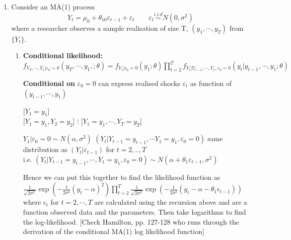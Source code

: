 \documentclass[oneside,openany]{tufte-book} %
\begin{document}
\begin{enumerate}
						\item Consider an MA(1) process
						\begin{equation} Y_t=\mu_0+ \theta_{10} \varepsilon_{t-1}+\varepsilon_t  \qquad 	 \varepsilon _{t}\overset{i.i.d}{\sim} N(0,\sigma^2) \end{equation}
						where a researcher observes a sample realisation of size T, $(y_1,\cdots, y_T)$ from $\{Y_t\}$.
						\medskip
						\begin{enumerate}
						\item	 \textbf{Conditional likelihood:}				 $f_{Y_T,\cdots, Y_1|\varepsilon_0=0}(y_T,\cdots,y_1,; \theta)= f_{Y_1|\epsilon_0=0}(y_1;\theta)	 \displaystyle \prod_{t=2}^{T} f_{Y_t|Y_{t-1},\cdots ,Y_1,\varepsilon_0=0}(y_t| y_{t-1}, \cdots,y_1; \theta)$
					
							
						 \textbf{Conditional on} $\varepsilon_0=0$ can express realised shocks $\varepsilon_t$ as function of $(y_{t-1}, \cdots, y_1)$ 
							
							
						\vspace{15pt}
						   \hspace{39pt}            [$Y_1=y_1$]\\
					\vspace{9pt}
						         \hspace{39pt}         [$Y_1=y_1, Y_2=y_2$]	\vspace{9pt}
						      \hspace{39pt}            $\vdots$	\vspace{9pt}
						 \hspace{39pt}    [$Y_1=y_1, \cdots, Y_T=y_T$]
						
							\vspace{15pt}
				  $Y_1|\varepsilon_0=0\sim  N(\alpha,\sigma^2)$
							\vspace{12pt}
						 $(Y_t|Y_{t-1}=y_{t-1},\cdots Y_1=y_1,\varepsilon_0=0)$ same distribution as $(Y_{t}|\varepsilon_{t-1})$ \hspace{7pt} for  $t=2,..,T$\\
							\vspace{8pt}
						i.e. 	       \hspace{32pt}  $(Y_t|Y_{t-1}=y_{t-1},\cdots, Y_1=y_1,\varepsilon_0=0)	\sim N(\alpha+\theta_1\varepsilon_{t-1}, \sigma^2)$ 
							
							
							Hence we can put this together to find the likelihood function as\\
							 $ \frac{1}{\sqrt{2\sigma^2}}\exp(-\frac{1}{2\sigma^2}(y_t-\alpha)^2)\prod_{t=2}^{T}\frac{1}{\sqrt{2\sigma^2}}\exp(-\frac{1}{2\sigma^2}(y_t-\alpha-\theta_1\epsilon_{t-1}))$
									where $\epsilon_t$ for $t=2,\cdots, T$ are calculated using the recursion above and are a function observed data and the parameters. Then take logarithms to find the log-likelihood. [Check Hamilton, pp. 127-128 who runs through the derivation of the conditional MA(1) log likelihood function]
							

\end{enumerate}
\end{enumerate}
\end{document}
